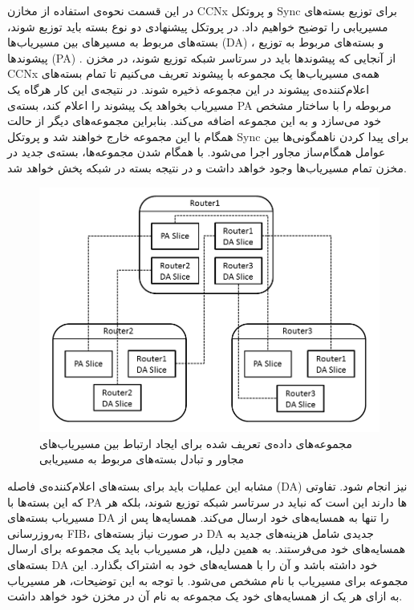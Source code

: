 
در این قسمت نحوه‌ی استفاده از مخازن CCNx و پروتکل Sync برای توزیع بسته‌های مسیریابی را توضیح خواهیم داد. در پروتکل پیشنهادی دو نوع بسته باید توزیع شوند، بسته‌های مربوط به مسیرهای بین مسیریاب‌ها (DA) ، و بسته‌های مربوط به توزیع پیشوندها (PA) . از آنجایی که پیشوندها باید در سرتاسر شبکه توزیع شوند، در مخزن CCNx همه‌ی مسیریاب‌ها یک مجموعه با پیشوند  تعریف می‌کنیم تا تمام بسته‌های اعلام‌کننده‌ی پیشوند در این مجموعه ذخیره شوند. در نتیجه‌ی این کار هرگاه یک مسیریاب بخواهد یک پیشوند را اعلام کند، بسته‌ی PA مربوطه را با ساختار مشخص خود می‌سازد و به این مجموعه اضافه می‌کند. بنابراین مجموعه‌های دیگر از حالت همگام با این مجموعه خارج خواهند شد و پروتکل Sync برای پیدا کردن ناهمگونی‌ها بین عوامل همگام‌ساز مجاور اجرا می‌شود. با همگام شدن مجموعه‌ها، بسته‌ی جدید در مخزن تمام مسیریاب‌ها وجود خواهد داشت و در نتیجه بسته در شبکه پخش خواهد شد.

\begin{figure}[h!]
\centering
\includegraphics[scale=0.7]{./resources/figures/connection.png}
\caption{مجموعه‌های داده‌ی تعریف شده برای ایجاد ارتباط بین مسیریاب‌های مجاور و تبادل بسته‌های مربوط به مسیریابی}
\label{fig:connection}
\end{figure}

مشابه این عملیات باید برای بسته‌های اعلام‌کننده‌ی فاصله (DA) نیز انجام شود. تفاوتی که این بسته‌ها با PA ها دارند این است که نباید در سرتاسر شبکه توزیع شوند، بلکه هر مسیریاب بسته‌های DA را تنها به همسایه‌های خود ارسال می‌کند. همسایه‌ها پس از به‌روزرسانی  FIB، در صورت نیاز بسته‌های DA جدیدی شامل هزینه‌های جدید به همسایه‌های خود می‌فرستند. به همین دلیل، هر مسیریاب باید یک مجموعه برای ارسال بسته‌های DA خود داشته باشد و آن را با همسایه‌های خود به اشتراک بگذارد. این مجموعه برای مسیریاب  با نام   مشخص می‌شود. با توجه به این توضیحات، هر مسیریاب به ازای هر یک از همسایه‌های خود یک مجموعه به نام آن در مخزن خود خواهد داشت. 

